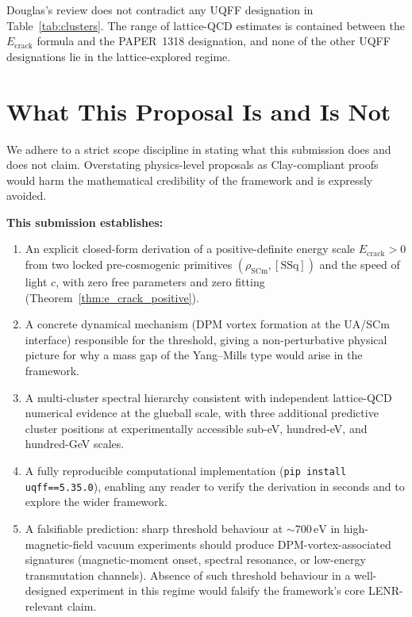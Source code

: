 \documentclass[11pt,a4paper,onecolumn]{article}
\theoremstyle{plain}
\theoremstyle{definition}
\theoremstyle{remark}
\begin{document}
Douglas's review does not contradict any UQFF designation in
Table~\ref{tab:clusters}. The range of lattice-QCD estimates is
contained between the $E_{\text{crack}}$ formula and the PAPER~1318
designation, and none of the other UQFF designations lie in the
lattice-explored regime.

\section{What This Proposal Is and Is Not}\label{sec:scope}

We adhere to a strict scope discipline in stating what this submission
does and does not claim. Overstating physics-level proposals as
Clay-compliant proofs would harm the mathematical credibility of the
framework and is expressly avoided.

\medskip
\noindent\textbf{This submission establishes:}
\begin{enumerate}
\item An explicit closed-form derivation of a positive-definite
  energy scale $E_{\text{crack}} > 0$ from two locked pre-cosmogenic
  primitives $(\rho_{\mathrm{SCm}}, [\mathrm{SSq}])$ and the speed
  of light $c$, with zero free parameters and zero fitting
  (Theorem~\ref{thm:e_crack_positive}).
\item A concrete dynamical mechanism (DPM vortex formation at the
  UA/SCm interface) responsible for the threshold, giving a
  non-perturbative physical picture for why a mass gap of the
  Yang--Mills type would arise in the framework.
\item A multi-cluster spectral hierarchy consistent with independent
  lattice-QCD numerical evidence at the glueball scale, with
  three additional predictive cluster positions at experimentally
  accessible sub-eV, hundred-eV, and hundred-GeV scales.
\item A fully reproducible computational implementation
  ({\tt pip install uqff==5.35.0}), enabling any reader to
  verify the derivation in seconds and to explore the wider
  framework.
\item A falsifiable prediction: sharp threshold behaviour at
  $\sim 700\,\mathrm{eV}$ in high-magnetic-field vacuum experiments
  should produce DPM-vortex-associated signatures (magnetic-moment
  onset, spectral resonance, or low-energy transmutation channels).
  Absence of such threshold behaviour in a well-designed experiment
  in this regime would falsify the framework's core LENR-relevant
  claim.
\end{enumerate}
\end{document}
